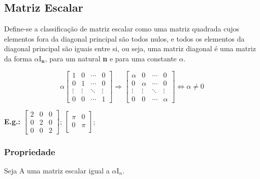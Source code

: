 \documentclass[a4paper,12pt]{article}
\begin{document}
\subsection{Matriz Escalar}

Define-se a classificação de matriz escalar como uma matriz quadrada cujos elementos fora da diagonal principal são todos nulos, e todos os elementos da diagonal principal são iguais entre si, ou seja, uma matriz diagonal é uma matriz da forma $ \alpha \text{I}_{\textbf{n}} $, para um natural \textbf{n} e para uma constante $ \alpha $.

 $$ \alpha \begin{bmatrix}
 1 & 0 &  \cdots & 0 \\
 0 & 1 &  \cdots & 0 \\
 \vdots & \vdots & \ddots & \vdots  \\ 
0 & 0  & \cdots & 1
 \end{bmatrix} \Rightarrow \begin{bmatrix}
 \alpha & 0 &  \cdots & 0 \\
 0 & \alpha &  \cdots & 0 \\
 \vdots & \vdots & \ddots & \vdots  \\ 
0 & 0  & \cdots & \alpha
 \end{bmatrix} \Leftrightarrow \alpha \neq 0 $$

\textbf{E.g.:} $ \begin{bmatrix}
2 & 0 & 0\\
0 & 2 & 0 \\
0 & 0 & 2
\end{bmatrix} $; $\begin{bmatrix}
\pi & 0 \\
0 & \pi  \\
\end{bmatrix}$; 

\subsubsection{Propriedade}

Seja $ \text{A} $ uma matriz escalar igual a $ \alpha \text{I}_{n} $.
\end{document}
